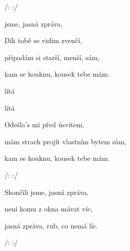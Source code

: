 

/:        :/

\zs
{} jsme, jasná zpráva,

  

  
\ks

\zs
Dík tobě se vidím zvenčí,

připadám si starší, menší, sám,

kam se kouknu, kousek tebe mám.
\ks

\zr
{}   

  

   

  lítá 

lítá  
\kr

\zs
Odešla's mi před úsvitem,

mám strach projít vlastním bytem sám,

kam se kouknu, kousek tebe mám.
\ks

/:        :/

\zr\kr

\zs
Skončili jsme, jasná zpráva,

není komu z okna mávat víc,

jasná zpráva, rub, co nemá líc.
\ks

/:        :/

\kp
